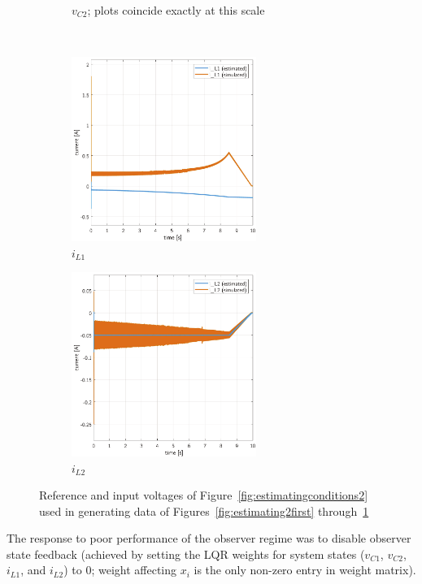 \begin{figure}[H]
\begin{framed}
\begin{subfigure}[b]{0.45\textwidth}
    \caption{$v_{C2}$; plots coincide exactly at this scale}
    \end{subfigure}
    \\[11pt]
    \begin{subfigure}[b]{0.45\textwidth}
    \centering
    \includegraphics[height = 6cm]{figures/estimation/iL1_iL1b.pdf}
    \caption{$i_{L1}$}
    \end{subfigure}
    \hfill
    \begin{subfigure}[b]{0.45\textwidth}
    \centering
    \includegraphics[height = 6cm]{figures/estimation/iL2_iL2b.pdf}
    \caption{$i_{L2}$}
    \label{fig:estimating2last}
    \end{subfigure}
    \end{framed}
    \vspace*{-8mm}
    \caption{Reference and input voltages of Figure~\ref{fig:estimatingconditions2} used in generating data of Figures~\ref{fig:estimating2first} through~\ref{fig:estimating2last}}
    \label{fig:estimating2}
\end{figure}
The response to poor performance of the observer regime was to disable observer state feedback (achieved by setting the LQR weights for system states ($v_{C1}$, $v_{C2}$, $i_{L1}$, and $i_{L2}$) to 0; weight affecting $x_i$ is the only non-zero entry in weight matrix).
